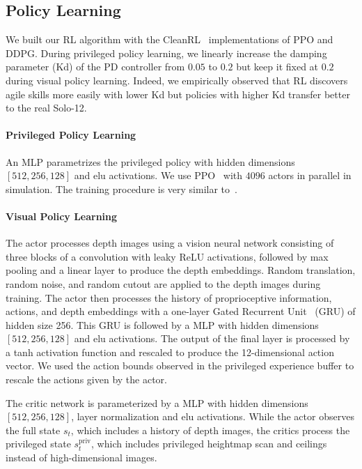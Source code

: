 \subsection{Policy Learning}
\label{appendix:policy_learning}

We built our RL algorithm with the CleanRL~\citep{huang2022cleanrl} implementations of PPO and DDPG.
During privileged policy learning, we linearly increase the damping parameter (Kd) of the PD controller from $0.05$ to $0.2$ but keep it fixed at $0.2$ during visual policy learning.
Indeed, we empirically observed that RL discovers agile skills more easily with lower Kd but policies with higher Kd transfer better to the real Solo-12.


\paragraph{Privileged Policy Learning}
An MLP parametrizes the privileged policy with hidden dimensions $[512, 256, 128]$ and elu activations.
We use PPO~\citep{schulman2017proximal} with $4096$ actors in parallel in simulation.
The training procedure is very similar to~\citep{rudin2022learning, cheng2023parkour, chane2024cat}. 


\paragraph{Visual Policy Learning}
The actor processes depth images using a vision neural network consisting of three blocks of a convolution with leaky ReLU activations, followed by max pooling and a linear layer to produce the depth embeddings.
Random translation, random noise, and random cutout are applied to the depth images during training.
The actor then processes the history of proprioceptive information, actions, and depth embeddings with a one-layer Gated Recurrent Unit~\citep{chung2014empirical} (GRU) of hidden size 256.
This GRU is followed by a MLP with hidden dimensions $[512, 256, 128]$ and elu activations.
The output of the final layer is processed by a tanh activation function and rescaled to produce the 12-dimensional action vector.
We used the action bounds observed in the privileged experience buffer to rescale the actions given by the actor.

The critic network is parameterized by a MLP with hidden dimensions $[512, 256, 128]$, layer normalization and elu activations.
While the actor observes the full state $s_t$, which includes a history of depth images, the critics process the privileged state $s_t^\text{priv}$, which includes privileged heightmap scan and ceilings instead of high-dimensional images.

